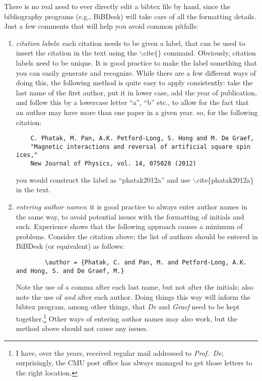 \documentclass[DIV=calc, paper=letter, fontsize=11pt]{scrartcl}	 %
\newcommand{\la}[2]{\textsf{$\backslash$#1}\{#2\}}
\begin{document}
There is no real need to ever directly edit a bibtex file by hand, since the bibliography programs (e.g., \textsf{BiBDesk})
will take care of all the formatting details.  Just a few comments that will help you avoid common pitfalls:
\begin{enumerate}
	\item \textit{citation labels}: each citation needs to be given a label, that can be used to insert the citation
	in the text using the \textsf{$\backslash$cite$\{\}$} command.  Obviously, citation labels need to be unique.  It is good practice to make the label something that 
	you can easily generate and recognize. While there are a few different ways of doing this, the following method is quite easy
	to apply consistently:  take the last name of the first author, put it in lower case, add the year of publication, and follow
	this by a lowercase letter ``a'', ``b'' etc., to allow for the fact that an author may have more than one paper
	in a given year. so, for the following citation:
	\begin{verbatim}
	C. Phatak, M. Pan, A.K. Petford-Long, S. Hong and M. De Graef, 
	"Magnetic interactions and reversal of artificial square spin ices," 
	New Journal of Physics, vol. 14, 075028 (2012)
	\end{verbatim}
	you would construct the label as ``phatak2012a'' and use \la{cite}{phatak2012a} in the text.
	
	\item \textit{entering author names}: it is good practice to always enter author names in the same way, to avoid potential 
	issues with the formatting of initials and such.  Experience shows that the following approach causes a minimum of problems.
	Consider the citation above; the list of authors should be entered in \textsf{BiBDesk} (or equivalent) as follows:
	\begin{verbatim}
		\author = {Phatak, C. and Pan, M. and Petford-Long, A.K. and Hong, S. and De Graef, M.}
	\end{verbatim}
	Note the use of a comma after each last name, but not after the initials; also note the use of \textit{and} after each author.
	Doing things this way will inform the bibtex program, among other things, that \textit{De} and \textit{Graef} need to be kept 
	together.\footnote{I have, over the years, received regular mail addressed to \textit{Prof.\ De}; surprisingly, the CMU post
	office has always managed to get those letters to the right location.}  Other ways of entering author names may also work, but 
	the method above should not cause any issues.	
	

\end{enumerate}
\end{document}
